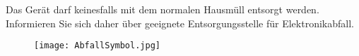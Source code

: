 Das Gerät darf keinesfalls mit dem normalen Hausmüll entsorgt werden. Informieren Sie sich daher über geeignete Entsorgungsstelle für Elektronikabfall.
\\[10mm]
\begin{figure}[h]
	\centering
	\texttt{[image: AbfallSymbol.jpg]}
\end{figure}